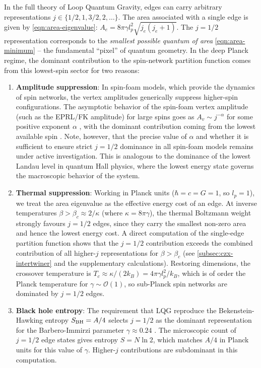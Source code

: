 \documentclass[preprint]{SciPost}
\theoremstyle{plain} %
\begin{document}
In the full theory of Loop Quantum Gravity, edges can carry arbitrary representations $ j \in \{1/2, 1, 3/2, 2, \ldots \} $. The area associated with a single edge is given by \eqref{eqn:area-eigenvalue}: $ A_e = 8\pi\gamma l_p^2 \sqrt{j_e(j_e + 1)} $. The $ j = 1/2 $ representation corresponds to the \emph{smallest possible quantum of area} \eqref{eqn:area-minimum} -- the fundamental ``pixel'' of quantum geometry. In the deep Planck regime, the dominant contribution to the spin-network partition function comes from this lowest-spin sector for two reasons:

\begin{enumerate}
	\item \textbf{Amplitude suppression}: In spin-foam models, which provide the dynamics of spin networks, the vertex amplitudes generically suppress higher-spin configurations. The asymptotic behavior of the spin-foam vertex amplitude (such as the EPRL/FK amplitude) for large spins goes as $ A_v \sim j^{-\alpha} $ for some positive exponent $ \alpha $ \cite{Dona2020Numerical,Dona2022Asymptotics}, with the dominant contribution coming from the lowest available spin \cite{Perez2013The-Spin-Foam}. Note, however, that the precise value of $ \alpha $ and whether it is sufficient to ensure strict $ j = 1/2 $ dominance in all spin-foam models remains under active investigation. This is analogous to the dominance of the lowest Landau level in quantum Hall physics, where the lowest energy state governs the macroscopic behavior of the system.

	\item \textbf{Thermal suppression}: Working in Planck units ($\hbar = c = G = 1$, so $l_p=1$), we treat the area eigenvalue as the effective energy cost of an edge. At inverse temperatures $\beta > \beta_c \approx 2/\kappa$ (where $\kappa = 8\pi\gamma$), the thermal Boltzmann weight strongly favours $j=1/2$ edges, since they carry the smallest non-zero area and hence the lowest energy cost. A direct computation of the single-edge partition function shows that the $j=1/2$ contribution exceeds the combined contribution of all higher-$j$ representations for $\beta > \beta_c$ (see \autoref{subsec:czx-intertwiner} and the supplementary calculations). Restoring dimensions, the crossover temperature is $T_c \approx \kappa/(2k_B) = 4\pi\gamma l_p^2/k_B$, which is of order the Planck temperature for $\gamma \sim \mathcal{O}(1)$, so sub-Planck spin networks are dominated by $j=1/2$ edges.

	\item \textbf{Black hole entropy}: The requirement that LQG reproduce the Bekenstein-Hawking entropy $ S_{\rm BH} = A/4 $ selects $ j = 1/2 $ as the dominant representation for the Barbero-Immirzi parameter $ \gamma \approx 0.24 $ \cite{Domagala2004Black-hole,Meissner2004Black-hole}. The microscopic count of $ j = 1/2 $ edge states gives entropy $ S = N \ln 2 $, which matches $ A/4 $ in Planck units for this value of $ \gamma $. Higher-$ j $ contributions are subdominant in this computation.
\end{enumerate}
\end{document}
